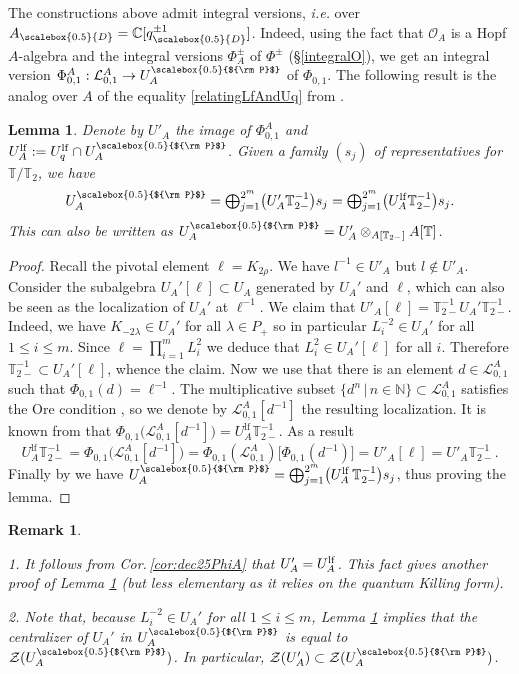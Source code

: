 \documentclass[11pt]{amsart}
\newtheorem{lem}[teo]{Lemma}
\newtheorem{remark}[teo]{Remark}
\newcommand{\qD}{q_{\scalebox{0.5}{D}}}
\newcommand{\AD}{A_{\scalebox{0.5}{D}}}
\newcommand{\Pup}{{\scalebox{0.5}{${\rm P}$}}}
\begin{document}
\indent The constructions above admit integral versions, \textit{i.e.} over $\AD = \mathbb{C}[\qD^{\pm 1}]$. Indeed, using the fact that $\mathcal{O}_A$ is a Hopf $A$-algebra and the integral versions $\Phi^\pm_A$ of $\Phi^\pm$ (\S\ref{integralO}), we get an integral version $\Phi_{0,1}^A : \mathcal{L}_{0,1}^A \to U_A^\Pup$ of $\Phi_{0,1}$. The following result is the analog over $A$ of the equality \eqref{relatingLfAndUq} from \cite[\S 6.4]{JL}. 
\begin{lem}\label{lemmaJLforUA}
Denote by $U'_A$ the image of $\Phi_{0,1}^A$ and $U_A^{\mathrm{lf}} := U_q^{\mathrm{lf}} \cap U_A^\Pup$. Given a family $(s_j)$ of representatives for $\mathbb{T}/\mathbb{T}_2$, we have
\[ \textstyle U_A^\Pup = \bigoplus_{j=1}^{2^m} \bigl( U'_A \mathbb{T}_{2-}^{-1} \bigr)s_j = \bigoplus_{j=1}^{2^m} \bigl( U_A^{\rm lf} \mathbb{T}_{2-}^{-1} \bigr)s_j. \]
This can also be written as $U_A^\Pup = U'_A \otimes_{A[\mathbb{T}_{2-}]} A[\mathbb{T}]$.
\end{lem}
\begin{proof}
Recall the pivotal element $\ell = K_{2\rho}$. We have $l^{-1} \in U'_A$ but $l \not\in U'_A$. Consider the subalgebra $U_A'[\ell] \subset U_A$ generated by $U_A'$ and $\ell$, which can also be seen as the localization of $U_A'$ at $\ell^{-1}$. We claim that $U'_A[\ell] = \mathbb{T}_{2-}^{-1}U_A'\mathbb{T}_{2-}^{-1}$. Indeed, we have $K_{-2\lambda} \in U_A'$ for all $\lambda \in P_+$ \cite[Prop.\,2.24]{BR2} so in particular $L_i^{-2} \in U_A'$ for all $1 \leq i \leq m$. Since $\ell = \textstyle \prod_{i=1}^m L_i^2$ we deduce that $L_i^2 \in U_A'[\ell]$ for all $i$. Therefore $\mathbb{T}_{2-}^{-1} \subset U_A'[\ell]$, whence the claim.
Now we use that there is an element $d \in \mathcal{L}^A_{0,1}$ such that $\Phi_{0,1}(d) = \ell^{-1}$. The multiplicative subset
$\bigl\{ d^n \, \big\vert\, n \in \mathbb{N} \bigr\} \subset \mathcal{L}^A_{0,1}$ satisfies the Ore condition \cite[Cor.\,2.23]{BR2}, so we denote by $\mathcal{L}_{0,1}^A[d^{-1}]$ the resulting localization. It is known from \cite[Prop.\,2.24]{BR2} that $\Phi_{0,1}\bigl( \mathcal{L}_{0,1}^A [d^{-1}] \bigr) = U_A^{\mathrm{lf}}\mathbb{T}_{2-}^{-1}$. As a result
\[ U_A^{\mathrm{lf}}\mathbb{T}_{2-}^{-1} = \Phi_{0,1}\bigl( \mathcal{L}_{0,1}^A[d^{-1}] \bigr) = \Phi_{0,1}(\mathcal{L}_{0,1}^A)\bigl[ \Phi_{0,1}(d^{-1}) \bigr] = U'_A[\ell] = U'_A \mathbb{T}_{2-}^{-1}. \]
Finally by \cite[Prop.\,2.24]{BR2} we have $\textstyle U_A^\Pup = \bigoplus_{j=1}^{2^m} \bigl(U_A^{\mathrm{lf}}\,\mathbb{T}_{2-}^{-1}\bigr)s_j$, thus proving the lemma.
\end{proof}
\begin{remark}\label{rmkTechnicalPropUA}
{\rm 1. It follows from Cor.\,\ref{cor:dec25PhiA} that $U_A'= U_A^{\rm lf}$. This fact gives another proof of Lemma \ref{lemmaJLforUA} (but less elementary as it relies on the quantum Killing form).

2. Note that, because $L_i^{-2} \in U_A'$ for all $1 \leq i \leq m$, Lemma \ref{lemmaJLforUA} implies that the centralizer of $U_A'$ in $U_A^\Pup$ is equal to $\mathcal{Z}(U_A^\Pup)$. In particular, $\mathcal{Z}(U_A') \subset \mathcal{Z}(U_A^\Pup)$.}
\end{remark}
\end{document}
